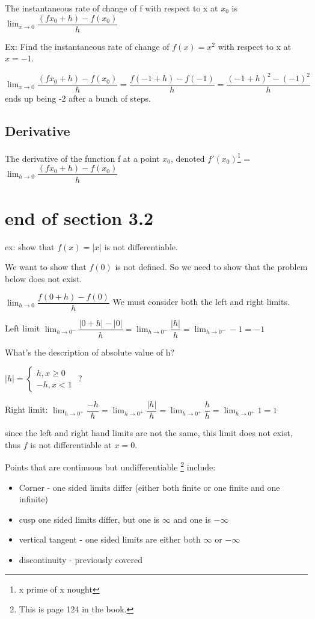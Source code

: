 \documentclass[12pt]{article}
\begin{document}
The instantaneous rate of change of f with respect to x at $x_{0}$ is $\lim_{x\to
  0}\dfrac{(fx_{0}+h)-f(x_{0})}{h}$

Ex: Find the instantaneous rate of change of $f(x)=x^{2}$ with respect to x at $x=-1$.

$\lim_{x\to 0}\dfrac{(fx_{0}+h)-f(x_{0})}{h} = \dfrac{f(-1+h)-f(-1)}{h} = \dfrac{(-1+h)^{2}-(-1)^{2}}{h}$ ends
up being -2 after a bunch of steps.

\subsection{Derivative}
The derivative of the function f at a point $x_{0}$, denoted $f'(x_{0})$\footnote{x prime of x nought} = $\lim_{h\to 0}\dfrac{(fx_{0}+h)-f(x_{0})}{h}$

\section{end of section 3.2}
ex: show that $f(x) = |x|$ is not differentiable.

We want to show that $f(0)$ is not defined. So we need to show that the problem below does not exist.

$\lim_{h\to0}\dfrac{f(0+h)-f(0)}{h}$ We must consider both the left and right limits.

Left limit
$\lim_{h\to0^{-}}\dfrac{|0+h|-|0|}{h} = \lim_{h\to0^{-}}\dfrac{|h|}{h} = \lim_{h\to0^{-}} -1 = -1$ 

What's the description of absolute value of h?

$|h| = \left\{\begin{array}{l}
h,x \geq 0\\
-h, x < 1
\end{array} \right. $ ?

Right limit:
$\lim_{h\to0^{+}}\dfrac{-h}{h} = \lim_{h\to0^{+}}\dfrac{|h|}{h} = \lim_{h\to0^{+}} \dfrac{h}{h} =
\lim_{h\to0^{+}} 1 = 1$

since the left and right hand limits are not the same, this limit does not exist, thus $f$ is not
differentiable at $x=0$.

Points that are continuous but undifferentiable \footnote{This is page 124 in the book.} include:

\begin{itemize}
\item Corner - one sided limits differ (either both finite or one finite and one infinite)
\item cusp one sided limits differ, but one is $\infty$ and one is $-\infty$
\item vertical tangent - one sided limits are either both $\infty$ or $-\infty$
\item discontinuity - previously covered
\end{itemize}
\end{document}
